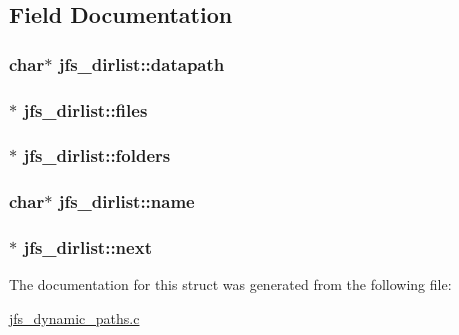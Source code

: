 \subsection{Field Documentation}
\hypertarget{structjfs__dirlist_afdf5d81463795356cd093961a77d8369}{
\subsubsection[{datapath}]{\setlength{\rightskip}{0pt plus 5cm}char$\ast$ {\bf jfs\_\-dirlist::datapath}}}
\label{structjfs__dirlist_afdf5d81463795356cd093961a77d8369}
\hypertarget{structjfs__dirlist_a0f43caa9531a996b79a3cf24dc974e3f}{
\subsubsection[{files}]{$\ast$ {\bf jfs\_\-dirlist::files}}}
\label{structjfs__dirlist_a0f43caa9531a996b79a3cf24dc974e3f}
\hypertarget{structjfs__dirlist_a993b95c955c4f78b0079b2dad962fdc9}{
\subsubsection[{folders}]{$\ast$ {\bf jfs\_\-dirlist::folders}}}
\label{structjfs__dirlist_a993b95c955c4f78b0079b2dad962fdc9}
\hypertarget{structjfs__dirlist_a16bb2c42c202a1ccf84320dabcf4ce2c}{
\subsubsection[{name}]{\setlength{\rightskip}{0pt plus 5cm}char$\ast$ {\bf jfs\_\-dirlist::name}}}
\label{structjfs__dirlist_a16bb2c42c202a1ccf84320dabcf4ce2c}
\hypertarget{structjfs__dirlist_a1a7405b37bae29b98228a7c2a9f11e67}{
\subsubsection[{next}]{$\ast$ {\bf jfs\_\-dirlist::next}}}
\label{structjfs__dirlist_a1a7405b37bae29b98228a7c2a9f11e67}


The documentation for this struct was generated from the following file:\begin{DoxyCompactItemize}
\item 
\hyperlink{jfs__dynamic__paths_8c}{jfs\_\-dynamic\_\-paths.c}\end{DoxyCompactItemize}
